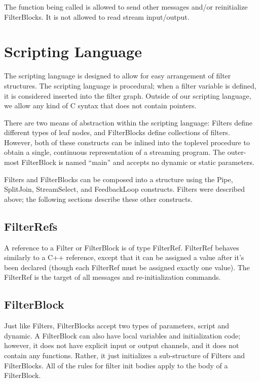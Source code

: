 \documentclass[draft]{article}
\begin{document}
The function being called is allowed to send other messages and/or reinitialize
FilterBlocks.  It is not allowed to read stream input/output.

\section{Scripting Language}

The scripting language is designed to allow for easy arrangement of
filter structures.  The scripting language is procedural; when a
filter variable is defined, it is considered inserted into the filter
graph.  Outside of our scripting language, we allow any kind of C
syntax that does not contain pointers.

There are two means of abstraction within the scripting language:
Filters define different types of leaf nodes, and FilterBlocks define
collections of filters.  However, both of these constructs can be
inlined into the toplevel procedure to obtain a single, continuous
representation of a streaming program.  The outer-most FilterBlock is
named ``main'' and accepts no dynamic or static parameters.

Filters and FilterBlocks can be composed into a structure using the
Pipe, SplitJoin, StreamSelect, and FeedbackLoop constructs.  Filters
were described above; the following sections describe these other
constructs.

\subsection{FilterRefs}

A reference to a Filter or FilterBlock is of type FilterRef.
FilterRef behaves similarly to a C++ reference, except that it can be
assigned a value after it's been declared (though each FilterRef must
be assigned exactly one value).  The FilterRef is the target of all
messages and re-initialization commands.

\subsection{FilterBlock}

Just like Filters, FilterBlocks accept two types of parameters, script
and dynamic.  A FilterBlock can also have local variables and
initialization code; however, it does not have explicit input or
output channels, and it does not contain any functions.  Rather, it
just initializes a sub-structure of Filters and FilterBlocks.  All of
the rules for filter init bodies apply to the body of a FilterBlock.
\end{document}
